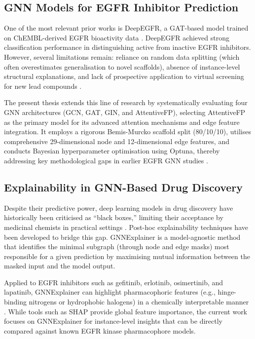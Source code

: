 \subsection{GNN Models for EGFR Inhibitor Prediction}

One of the most relevant prior works is DeepEGFR, a GAT-based model trained on ChEMBL-derived EGFR bioactivity data \parencite{Maliketal2025}. DeepEGFR achieved strong classification performance in distinguishing active from inactive EGFR inhibitors. However, several limitations remain: reliance on random data splitting (which often overestimates generalisation to novel scaffolds), absence of instance-level structural explanations, and lack of prospective application to virtual screening for new lead compounds \parencite{Maliketal2025, Jiangetal2021}.

The present thesis extends this line of research by systematically evaluating four GNN architectures (GCN, GAT, GIN, and AttentiveFP), selecting AttentiveFP as the primary model for its advanced attention mechanisms and edge feature integration. It employs a rigorous Bemis-Murcko scaffold split (80/10/10), utilises comprehensive 29-dimensional node and 12-dimensional edge features, and conducts Bayesian hyperparameter optimisation using Optuna, thereby addressing key methodological gaps in earlier EGFR GNN studies \parencite{Jiangetal2021}.

\subsection{Explainability in GNN-Based Drug Discovery}

Despite their predictive power, deep learning models in drug discovery have historically been criticised as ``black boxes,'' limiting their acceptance by medicinal chemists in practical settings \parencite{Luoetal2022}. Post-hoc explainability techniques have been developed to bridge this gap. GNNExplainer \parencite{Yingetal2019} is a model-agnostic method that identifies the minimal subgraph (through node and edge masks) most responsible for a given prediction by maximising mutual information between the masked input and the model output. 

Applied to EGFR inhibitors such as gefitinib, erlotinib, osimertinib, and lapatinib, GNNExplainer can highlight pharmacophoric features (e.g., hinge-binding nitrogens or hydrophobic halogens) in a chemically interpretable manner \parencite{Yingetal2019, Luoetal2022}. While tools such as SHAP provide global feature importance, the current work focuses on GNNExplainer for instance-level insights that can be directly compared against known EGFR kinase pharmacophore models.

